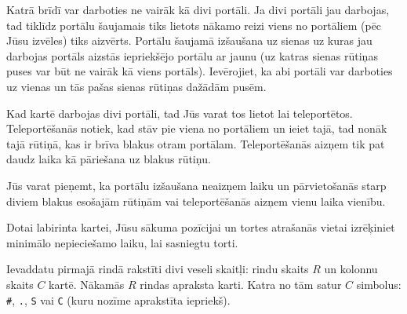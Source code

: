 \documentclass{boi2014-lv}
\newcommand{\constant}[1]{{\tt #1}}
\begin{document}
		Katrā brīdī var darboties ne vairāk kā divi portāli. Ja divi portāli jau darbojas, tad tiklīdz portālu šaujamais tiks lietots nākamo reizi viens no portāliem (pēc Jūsu izvēles) tiks aizvērts. Portālu šaujamā izšaušana uz sienas uz kuras jau darbojas portāls aizstās iepriekšējo portālu ar jaunu (uz katras sienas rūtiņas puses var būt ne vairāk kā viens portāls). Ievērojiet, ka abi portāli var darboties uz vienas un tās pašas sienas rūtiņas dažādām pusēm.

		Kad kartē darbojas divi portāli, tad Jūs varat tos lietot lai teleportētos. Teleportēšanās notiek, kad stāv pie viena no portāliem un ieiet tajā, tad nonāk tajā rūtiņā, kas ir brīva blakus otram portālam. Teleportēšanās aizņem tik pat daudz laika kā pāriešana uz blakus rūtiņu.

		Jūs varat pieņemt, ka portālu izšaušana neaizņem laiku un pārvietošanās starp diviem blakus esošajām rūtiņām vai teleportēšanās aizņem vienu laika vienību.

    \Task
    
		Dotai labirinta kartei, Jūsu sākuma pozīcijai un tortes atrašanās vietai izrēķiniet minimālo nepieciešamo laiku, lai sasniegtu torti.

    \Input
		
		Ievaddatu pirmajā rindā rakstīti divi veseli skaitļi: rindu skaits $R$ un kolonnu skaits $C$ kartē. Nākamās $R$ rindas apraksta karti. Katra no tām satur $C$ simbolus: \constant{\#}, \constant{.}, \constant{S} vai \constant{C} (kuru nozīme aprakstīta iepriekš).
		
\end{document}
